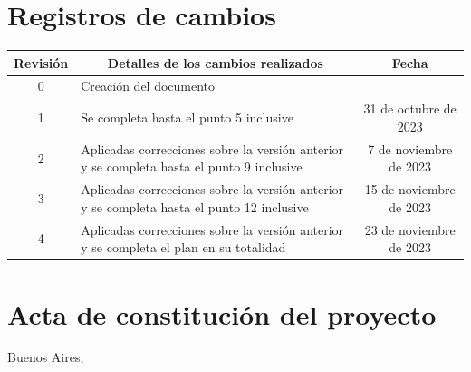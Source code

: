 \documentclass[
11pt, %
]{Clases/charter}
\begin{document}
\maketitle
\thispagestyle{empty}
\pagebreak


\thispagestyle{empty}
{\setlength{\parskip}{0pt}
	\tableofcontents{}
}
\pagebreak


\section*{Registros de cambios}
\label{sec:registro}


\begin{table}[ht]
	\label{tab:registro}
	\centering
	\begin{tabularx}{\linewidth}{@{}|c|X|c|@{}}
		\hline
		\rowcolor[HTML]{C0C0C0}
		Revisión & \multicolumn{1}{c|}{\cellcolor[HTML]{C0C0C0}Detalles de los cambios realizados}            & Fecha                   \\ \hline
		0        & Creación del documento                                                                     & \fechaInicioName        \\ \hline
		1        & Se completa hasta el punto 5 inclusive                                                     & 31 de octubre de 2023   \\ \hline
		2        & Aplicadas correcciones sobre la versión anterior y se completa hasta el punto 9 inclusive  & 7 de noviembre de 2023  \\ \hline
		3        & Aplicadas correcciones sobre la versión anterior y se completa hasta el punto 12 inclusive & 15 de noviembre de 2023 \\ \hline
		4        & Aplicadas correcciones sobre la versión anterior y se completa el plan en su totalidad     & 23 de noviembre de 2023 \\ \hline
	\end{tabularx}
\end{table}

\pagebreak



\section*{Acta de constitución del proyecto}
\label{sec:acta}

\begin{flushright}
	Buenos Aires, \fechaInicioName
\end{flushright}
\end{document}

